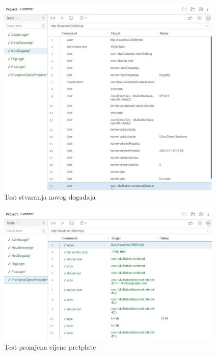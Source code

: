 			\begin{figure}[H]
				\includegraphics[scale=0.45]{testovi/selNoviDogadaj.jpeg}
				\centering
				\caption{Test stvaranja novog događaja}
				\label{fig:promjene}
			\end{figure}
			
			\begin{figure}[H]
				\includegraphics[scale=0.45]{testovi/selPretplata.jpeg}
				\centering
				\caption{Test promjena cijene pretplate}
				\label{fig:promjene}
			\end{figure}
			
